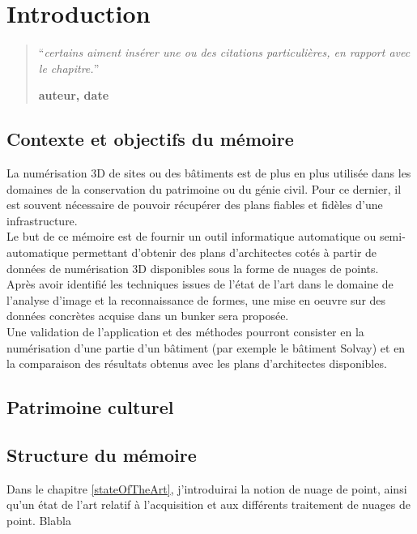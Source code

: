 \chapter{Introduction}
\setcounter{page}{1}
\begin{quotation}
\noindent ``\emph{certains aiment insérer une ou des citations particulières, en rapport avec le chapitre.}''
\begin{flushright}\textbf{auteur, date}\end{flushright}
\end{quotation}

\vspace*{0.5cm}

\section{Contexte et objectifs du mémoire}
La numérisation 3D de sites ou des bâtiments est de plus en plus utilisée dans les domaines de la conservation du patrimoine ou du génie civil. Pour ce dernier, il est souvent nécessaire de pouvoir récupérer des plans fiables et fidèles d'une infrastructure.\\

Le but de ce mémoire est de fournir un outil informatique automatique ou semi-automatique permettant d'obtenir des plans d'architectes cotés à partir de données de numérisation 3D disponibles sous la forme de nuages de points.\\

Après avoir identifié les techniques issues de l'état de l'art dans le domaine de l'analyse d'image et la reconnaissance de formes, une mise en oeuvre sur des données concrètes acquise dans un bunker sera proposée.\\

Une validation de l'application et des méthodes pourront consister en la numérisation d'une partie d'un bâtiment (par exemple le bâtiment Solvay) et en la comparaison des résultats obtenus avec les plans d'architectes disponibles.

\section{Patrimoine culturel ~\cite{greenwade93}}

\section{Structure du mémoire}
Dans le chapitre \ref{stateOfTheArt}, j'introduirai la notion de nuage de point, ainsi qu'un état de l'art relatif à l'acquisition et aux différents traitement de nuages de point.
Blabla

